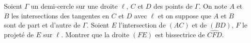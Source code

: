 Soient $\Gamma$ un demi-cercle sur une droite $\ell$, $C$ et $D$ des points de $\Gamma$. On note $A$ et $B$ les intersections des tangentes en $C$ et $D$ avec $\ell$ et on suppose que $A$ et $B$ sont de part et d'autre de $\Gamma$. Soient $E$ l'intersection de $(AC)$ et de $(BD)$, $F$ le projeté de $E$ sur $\ell$. Montrer que la droite $(FE)$ est bissectrice de $\widehat{CFD}$.
